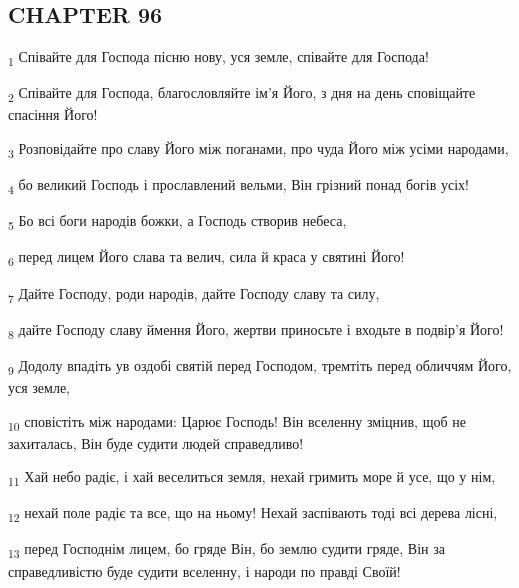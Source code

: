 \subsection{CHAPTER 96}
\begin{tcolorbox}
\textsubscript{1} Співайте для Господа пісню нову, уся земле, співайте для Господа!
\end{tcolorbox}
\begin{tcolorbox}
\textsubscript{2} Співайте для Господа, благословляйте ім'я Його, з дня на день сповіщайте спасіння Його!
\end{tcolorbox}
\begin{tcolorbox}
\textsubscript{3} Розповідайте про славу Його між поганами, про чуда Його між усіми народами,
\end{tcolorbox}
\begin{tcolorbox}
\textsubscript{4} бо великий Господь і прославлений вельми, Він грізний понад богів усіх!
\end{tcolorbox}
\begin{tcolorbox}
\textsubscript{5} Бо всі боги народів божки, а Господь створив небеса,
\end{tcolorbox}
\begin{tcolorbox}
\textsubscript{6} перед лицем Його слава та велич, сила й краса у святині Його!
\end{tcolorbox}
\begin{tcolorbox}
\textsubscript{7} Дайте Господу, роди народів, дайте Господу славу та силу,
\end{tcolorbox}
\begin{tcolorbox}
\textsubscript{8} дайте Господу славу ймення Його, жертви приносьте і входьте в подвір'я Його!
\end{tcolorbox}
\begin{tcolorbox}
\textsubscript{9} Додолу впадіть ув оздобі святій перед Господом, тремтіть перед обличчям Його, уся земле,
\end{tcolorbox}
\begin{tcolorbox}
\textsubscript{10} сповістіть між народами: Царює Господь! Він вселенну зміцнив, щоб не захиталась, Він буде судити людей справедливо!
\end{tcolorbox}
\begin{tcolorbox}
\textsubscript{11} Хай небо радіє, і хай веселиться земля, нехай гримить море й усе, що у нім,
\end{tcolorbox}
\begin{tcolorbox}
\textsubscript{12} нехай поле радіє та все, що на ньому! Нехай заспівають тоді всі дерева лісні,
\end{tcolorbox}
\begin{tcolorbox}
\textsubscript{13} перед Господнім лицем, бо гряде Він, бо землю судити гряде, Він за справедливістю буде судити вселенну, і народи по правді Своїй!
\end{tcolorbox}
